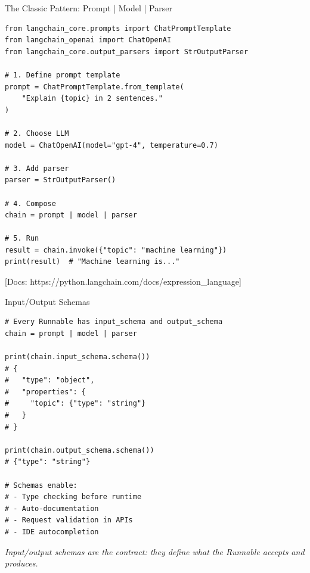 \documentclass[aspectratio=169,11pt]{beamer}
\newcommand{\docref}[1]{{\scriptsize\color{docgray}[Docs: #1]}}
\begin{document}
\begin{frame}[fragile]{The Classic Pattern: Prompt | Model | Parser}
  \begin{codebox}
\begin{lstlisting}
from langchain_core.prompts import ChatPromptTemplate
from langchain_openai import ChatOpenAI
from langchain_core.output_parsers import StrOutputParser

# 1. Define prompt template
prompt = ChatPromptTemplate.from_template(
    "Explain {topic} in 2 sentences."
)

# 2. Choose LLM
model = ChatOpenAI(model="gpt-4", temperature=0.7)

# 3. Add parser
parser = StrOutputParser()

# 4. Compose
chain = prompt | model | parser

# 5. Run
result = chain.invoke({"topic": "machine learning"})
print(result)  # "Machine learning is..."
\end{lstlisting}
  \end{codebox}

  \docref{https://python.langchain.com/docs/expression\_language}
\end{frame}

\begin{frame}[fragile]{Input/Output Schemas}
  \begin{codebox}
\begin{lstlisting}
# Every Runnable has input_schema and output_schema
chain = prompt | model | parser

print(chain.input_schema.schema())
# {
#   "type": "object",
#   "properties": {
#     "topic": {"type": "string"}
#   }
# }

print(chain.output_schema.schema())
# {"type": "string"}

# Schemas enable:
# - Type checking before runtime
# - Auto-documentation
# - Request validation in APIs
# - IDE autocompletion
\end{lstlisting}
  \end{codebox}

  \vspace{0.12em}
  \small \textit{Input/output schemas are the contract: they define what the Runnable accepts and produces.}
\end{frame}
\end{document}
